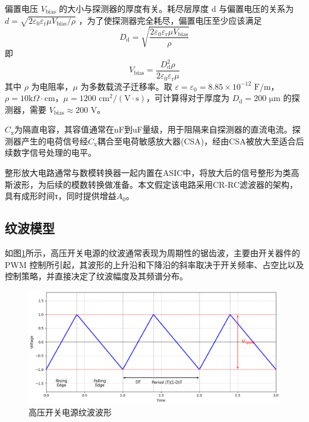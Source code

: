 \documentclass[twocolumn]{ctexart}
\begin{document}
偏置电压 $V_{\mathrm{bias}}$ 的大小与探测器的厚度有关。耗尽层厚度 d 与偏置电压的关系为 $d = \sqrt{2\varepsilon_0\varepsilon_{\mathrm{r}}\mu V_{\mathrm{bias}} / \rho}$ \cite{9}，为了使探测器完全耗尽，偏置电压至少应该满足
\begin{equation}
D_{\mathrm{d}} = \sqrt{\frac{2\varepsilon_0\varepsilon_{\mathrm{r}}\mu V_{\mathrm{bias}}}{\rho}}
\end{equation}
即
\begin{equation}
V_{\mathrm{bias}} = \frac{D_{\mathrm{d}}^2\rho}{2\varepsilon_0\varepsilon_{\mathrm{r}}\mu}
\end{equation}
其中 $\rho$ 为电阻率，$\mu$ 为多数载流子迁移率。取 $\varepsilon = \varepsilon_0 = 8.85 \times 10^{-12} \text{ F/m}$， $\rho = 10 \text{k}\Omega \cdot \text{cm}$，$\mu = 1200 \text{ cm}^2/(\text{V} \cdot \text{s})$，可计算得对于厚度为 $D_{\mathrm{d}} = 200 \text{ μm}$ 的探测器，需要 $V_{\mathrm{bias}} \approx 200 \text{ V}$。

$C_{\mathrm{x}}$为隔直电容，其容值通常在nF到uF量级，用于阻隔来自探测器的直流电流。探测器产生的电荷信号经$C_{\mathrm{x}}$耦合至电荷敏感放大器(CSA)，经由CSA被放大至适合后续数字信号处理的电平。

整形放大电路通常与数模转换器一起内置在ASIC中，将放大后的信号整形为类高斯波形，为后续的模数转换做准备。本文假定该电路采用CR-RC滤波器的架构\cite{10}，具有成形时间τ，同时提供增益$A_0$。

\subsection{纹波模型}

如图\ref{fig:ripple}所示，高压开关电源的纹波通常表现为周期性的锯齿波，主要由开关器件的 PWM 控制所引起\cite{11}，其波形的上升沿和下降沿的斜率取决于开关频率、占空比以及控制策略，并直接决定了纹波幅度及其频谱分布\cite{12}。

\begin{figure}[htbp]
    \centering
    \includegraphics[width=\linewidth]{./ripple.png}
    \caption{高压开关电源纹波波形}
    \label{fig:ripple}
\end{figure}
\end{document}
